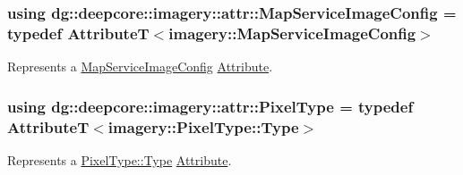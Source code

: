 \subsubsection[{\texorpdfstring{Map\+Service\+Image\+Config}{MapServiceImageConfig}}]{\setlength{\rightskip}{0pt plus 5cm}using {\bf dg\+::deepcore\+::imagery\+::attr\+::\+Map\+Service\+Image\+Config} = typedef AttributeT$<$imagery\+::\+Map\+Service\+Image\+Config$>$}\hypertarget{group___imagery_attributes_gac05046a81d3ec2c6f4cd6ecba9c88018}{}\label{group___imagery_attributes_gac05046a81d3ec2c6f4cd6ecba9c88018}


Represents a \hyperlink{structdg_1_1deepcore_1_1imagery_1_1_map_service_image_config}{Map\+Service\+Image\+Config} \hyperlink{classdg_1_1deepcore_1_1_attribute}{Attribute}. 

\subsubsection[{\texorpdfstring{Pixel\+Type}{PixelType}}]{\setlength{\rightskip}{0pt plus 5cm}using {\bf dg\+::deepcore\+::imagery\+::attr\+::\+Pixel\+Type} = typedef AttributeT$<$imagery\+::\+Pixel\+Type\+::\+Type$>$}\hypertarget{group___imagery_attributes_gaa884544bf20ab4b9900b402d9243a4d0}{}\label{group___imagery_attributes_gaa884544bf20ab4b9900b402d9243a4d0}


Represents a \hyperlink{namespacedg_1_1deepcore_1_1imagery_1_1_pixel_type_a5f0c62edf4601cbd15e52b381697069d}{Pixel\+Type\+::\+Type} \hyperlink{classdg_1_1deepcore_1_1_attribute}{Attribute}. 

